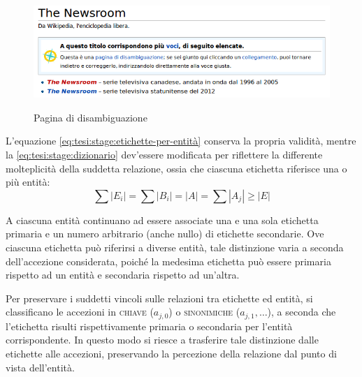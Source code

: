 \begin{figure}[ht]
	\begin{center}
		\includegraphics[width=12cm]{img/disambigua.png}
		\label{fig:tesi:stage:classificazione:disambiguazione}
		\caption{Pagina di disambiguazione \cite{wiki:disambigua}}
	\end{center}
\end{figure}

L'equazione \ref{eq:tesi:stage:etichette-per-entità} conserva la propria validità, mentre la \ref{eq:tesi:stage:dizionario} dev'essere modificata per riflettere la differente molteplicità della suddetta relazione, ossia che ciascuna etichetta riferisce una o più entità:
\begin{equation}
	\sum{\left|E_i\right|} = \sum{\left|B_i\right|} = \left|A\right| =	\sum{\left|A_j\right|} \geq \left|E\right|
\end{equation}


A ciascuna entità continuano ad essere associate una e una sola etichetta primaria e un numero arbitrario (anche nullo) di etichette secondarie. Ove ciascuna etichetta può riferirsi a diverse entità, tale distinzione varia a seconda dell'accezione considerata, poiché la medesima etichetta può essere primaria rispetto ad un entità e secondaria rispetto ad un'altra.

Per preservare i suddetti vincoli sulle relazioni tra etichette ed entità, si classificano le accezioni in \textsc{chiave} ($a_{j,0}$) o \textsc{sinonimiche} ($a_{j,1},\ldots$), a seconda che l'etichetta risulti rispettivamente primaria o secondaria per l'entità corrispondente. In questo modo si riesce a trasferire tale distinzione dalle etichette alle accezioni, preservando la percezione della relazione dal punto di vista dell'entità.

